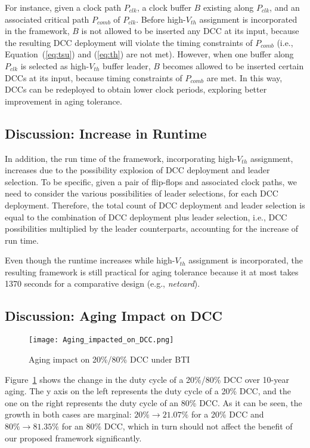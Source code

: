 For instance, given a clock path $P_{clk}$, a clock buffer $B$ existing along $P_{clk}$, and an associated critical path $P_{comb}$ of $P_{clk}$. Before high-$V_{th}$ assignment is incorporated in the framework, $B$ is not allowed to be inserted any DCC at its input, because the resulting DCC deployment will violate the timing constraints of $P_{comb}$ (i.e., Equation~(\ref{eq:tsu}) and (\ref{eq:th}) are not met). However, when one buffer along $P_{clk}$ is selected as high-$V_{th}$ buffer leader, $B$ becomes allowed to be inserted certain DCCs at its input, because timing constraints of $P_{comb}$ are met. In this way, DCCs can be redeployed to obtain lower clock periods, exploring better improvement in aging tolerance.


\subsection{Discussion: Increase in Runtime}
In addition, the run time of the framework, incorporating high-$V_{th}$ assignment, increases due to the possibility explosion of DCC deployment and leader selection. To be specific, given a pair of flip-flops and associated clock paths, we need to consider the various possibilities of leader selections, for each DCC deployment. Therefore, the total  count of DCC deployment and leader selection is equal to the combination of DCC deployment plus leader selection, i.e., DCC possibilities multiplied by the leader counterparts, accounting for the increase of run time. 

Even though the runtime increases while high-$V_{th}$ assignment is incorporated, the resulting framework is still practical for aging tolerance because it at most takes 1370 seconds for a comparative design (e.g., \textit{netcard}).
\subsection{Discussion: Aging Impact on DCC}
\begin{figure}
    \centering
     \texttt{[image: Aging\_impacted\_on\_DCC.png]} %
    \caption{Aging impact on 20\%/80\% DCC under BTI}
    \label{fig:exp4}
\end{figure}

Figure~\ref{fig:exp4} shows the change in the duty cycle of a 20\%/80\% DCC over 10-year aging. The y axis on the left represents the duty cycle of a 20\% DCC, and the one on the right represents the duty cycle of an 80\% DCC. As it can be seen, the growth in both cases are marginal: $20\% \to 21.07\%$ for a 20\% DCC and $80\% \to 81.35\%$ for an 80\% DCC, which in turn should not affect the benefit of our proposed framework significantly.


